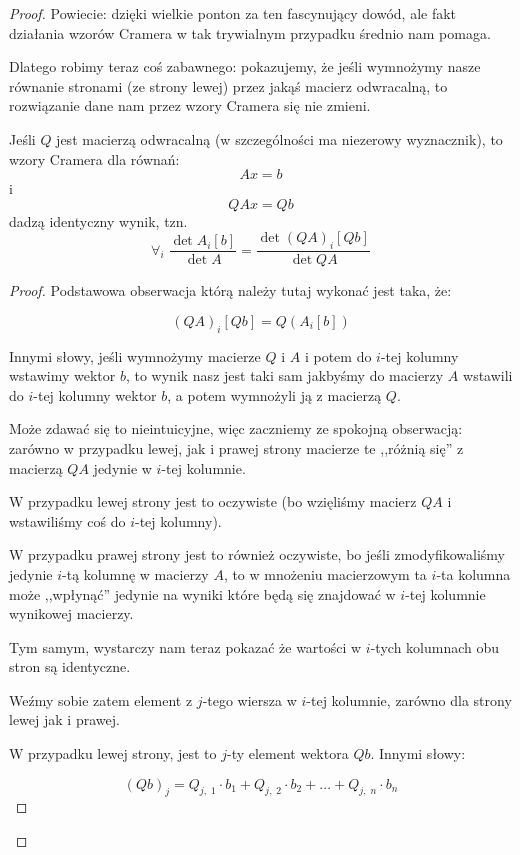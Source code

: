 \begin{proof}
Powiecie: dzięki wielkie ponton za ten fascynujący dowód, ale fakt działania wzorów Cramera w tak trywialnym przypadku średnio nam pomaga.

Dlatego robimy teraz coś zabawnego: pokazujemy, że jeśli wymnożymy nasze równanie stronami (ze strony lewej) przez jakąś macierz odwracalną, to rozwiązanie dane nam przez wzory Cramera się nie zmieni. 

\begin{lemma}
    Jeśli \(Q\) jest macierzą odwracalną (w szczególności ma niezerowy wyznacznik), to wzory Cramera dla równań:
    \[ 
        Ax = b
    \]
    i
    \[ 
        QAx = Qb
    \]
    dadzą identyczny wynik, tzn. 
    \[
        \forall_{i} \; \frac{\det{A_i[b]}}{\det{A}} = \frac{\det{(QA)_i[Qb]}}{\det{QA}}
    \]
\end{lemma}
\begin{proof}
Podstawowa obserwacja którą należy tutaj wykonać jest taka, że:

\[ 
    (QA)_i[Qb] = Q(A_i[b])
\]

Innymi słowy, jeśli wymnożymy macierze \(Q\) i \(A\) i potem do \(i\)-tej kolumny wstawimy wektor \(b\), to wynik nasz jest taki sam jakbyśmy do macierzy \(A\) wstawili do \(i\)-tej kolumny wektor \(b\), a potem wymnożyli ją z macierzą \(Q\).

Może zdawać się to nieintuicyjne, więc zaczniemy ze spokojną obserwacją: zarówno w przypadku lewej, jak i prawej strony macierze te ,,różnią się'' z macierzą \(QA\) jedynie w \(i\)-tej kolumnie.

W przypadku lewej strony jest to oczywiste (bo wzięliśmy macierz \(QA\) i wstawiliśmy coś do \(i\)-tej kolumny). 

W przypadku prawej strony jest to również oczywiste, bo jeśli zmodyfikowaliśmy jedynie \(i\)-tą kolumnę w macierzy \(A\), to w mnożeniu macierzowym ta \(i\)-ta kolumna może ,,wpłynąć'' jedynie na wyniki które będą się znajdować w \(i\)-tej kolumnie wynikowej macierzy. 

Tym samym, wystarczy nam teraz pokazać że wartości w \(i\)-tych kolumnach obu stron są identyczne. 

Weźmy sobie zatem element z \(j\)-tego wiersza w \(i\)-tej kolumnie, zarówno dla strony lewej jak i prawej.

W przypadku lewej strony, jest to \(j\)-ty element wektora \(Qb\). Innymi słowy:

\[
    (Qb)_{j} = Q_{j, \; 1} \cdot b_1 + Q_{j, \; 2} \cdot b_2 + \dots + Q_{j, \; n} \cdot b_n
\]


\end{proof}
\end{proof}
